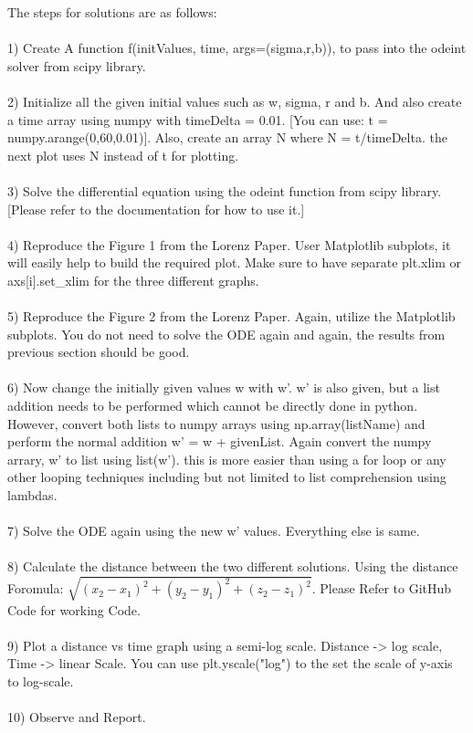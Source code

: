 \documentclass{article}
\begin{document}
The steps for solutions are as follows:\\\\
1) Create A function f(initValues, time, args=(sigma,r,b)), to pass into the odeint solver from scipy library. \\\\
2) Initialize all the given initial values such as w, sigma, r and b. And also create a time array using numpy with timeDelta = 0.01. [You can use: t = numpy.arange(0,60,0.01)]. Also, create an array N where N = t/timeDelta. the next plot uses N instead of t for plotting.\\\\
3) Solve the differential equation using the odeint function from scipy library. [Please refer to the documentation for how to use it.]\\\\
4) Reproduce the Figure 1 from the Lorenz Paper. User Matplotlib subplots, it will easily help to build the required plot. Make sure to have separate plt.xlim or axs[i].set\_xlim for the three different graphs.\\\\ 
5) Reproduce the Figure 2 from the Lorenz Paper. Again, utilize the Matplotlib subplots. You do not need to solve the ODE again and again, the results from previous section should be good.\\\\
6) Now change the initially given values w with w'. w' is also given, but a list addition needs to be performed which cannot be directly done in python. However, convert both lists to numpy arrays using np.array(listName) and perform the normal addition w' = w + givenList. Again convert the numpy arrary, w' to list using list(w'). this is more easier than using a for loop or any other looping techniques including but not limited to list comprehension using lambdas.  \\\\
7) Solve the ODE again using the new w' values. Everything else is same.\\\\
8) Calculate the distance between the two different solutions. Using the distance Foromula: $\sqrt{(x_2 - x_1)^2 + (y_2-y_1)^2 + (z_2-z_1)^2}$. Please Refer to GitHub  Code for working Code.\\\\
9) Plot a distance vs time graph using a semi-log scale. Distance -> log scale, Time -> linear Scale. You can use plt.yscale("log") to the set the scale of y-axis to log-scale. \\\\
10) Observe and Report.\\\\
\end{document}
